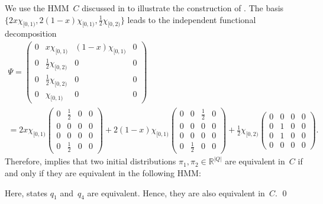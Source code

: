 \documentclass[a4paper,UKenglish,cleveref, autoref,mathscr]{lipics-v2019}
\newcommand{\RR}{\mathbb{R}}
\newcommand{\1}{\mathbbm{1}}
\begin{document}
\begin{example}
We use the HMM~$C$ discussed in  to illustrate the construction of .
The basis $\{2x\chi_{[0,1)}, 2(1-x)\chi_{[0,1)}, \frac12\chi_{[0,2)}\}$ leads to the independent functional decomposition
\begin{multline*}
\Psi  = \begin{pmatrix}
0 & x\chi_{[0,1)}  & (1-x)\chi_{[0,1)} & 0 \\
0 & \frac12 \chi_{[0,2)} & 0 & 0 \\
0 & \frac12 \chi_{[0,2)} & 0 & 0 \\
0 & \chi_{[0,1)} & 0 & 0
\end{pmatrix} \\
 = 2x\chi_{[0,1)}\begin{pmatrix}
0 & \frac12  & 0 & 0 \\
0 & 0 & 0 & 0 \\
0 & 0 & 0 & 0 \\
0 & \frac12 & 0 & 0
\end{pmatrix} + 2(1 - x)\chi_{[0,1)}\begin{pmatrix}
0 & 0  & \frac12 & 0 \\
0 & 0 & 0 & 0 \\
0 & 0 & 0 & 0 \\
0 & \frac12 & 0 & 0
\end{pmatrix} + \frac12 \chi_{[0,2)}\begin{pmatrix}
0 & 0  & 0 & 0 \\
0 & 1 & 0 & 0 \\
0 & 1 & 0 & 0 \\
0 & 0 & 0 & 0
\end{pmatrix}.
\end{multline*}
Therefore,  implies that two initial distributions $\pi_1, \pi_2 \in \RR^{|Q|}$ are equivalent in~$C$ if and only if they are equivalent in the following HMM:
\begin{center}
\end{center}
Here, states $q_1$ and~$q_4$ are equivalent.
Hence, they are also equivalent in~$C$.
\qed
\end{example}
\end{document}
